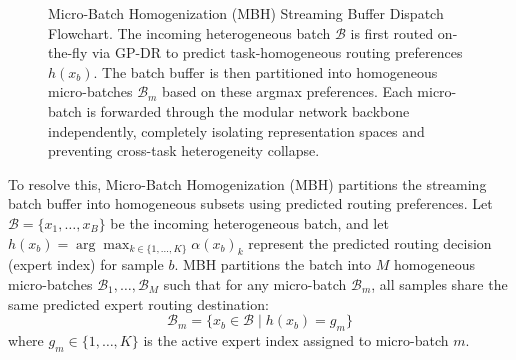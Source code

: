 \begin{figure}[t]
\centering
{}
\caption{Micro-Batch Homogenization (MBH) Streaming Buffer Dispatch Flowchart. The incoming heterogeneous batch $\mathcal{B}$ is first routed on-the-fly via GP-DR to predict task-homogeneous routing preferences $h(x_b)$. The batch buffer is then partitioned into homogeneous micro-batches $\mathcal{B}_m$ based on these argmax preferences. Each micro-batch is forwarded through the modular network backbone independently, completely isolating representation spaces and preventing cross-task heterogeneity collapse.}
\label{fig:mbh_flowchart}
\end{figure}

To resolve this, Micro-Batch Homogenization (MBH) partitions the streaming batch buffer into homogeneous subsets using predicted routing preferences. Let $\mathcal{B} = \{x_1, \dots, x_B\}$ be the incoming heterogeneous batch, and let $h(x_b) = \arg\max_{k \in \{1,\dots,K\}} \alpha(x_b)_k$ represent the predicted routing decision (expert index) for sample $b$. MBH partitions the batch into $M$ homogeneous micro-batches $\mathcal{B}_1, \dots, \mathcal{B}_M$ such that for any micro-batch $\mathcal{B}_m$, all samples share the same predicted expert routing destination:
\begin{equation}
\mathcal{B}_m = \{ x_b \in \mathcal{B} \mid h(x_b) = g_m \}
\end{equation}
where $g_m \in \{1, \dots, K\}$ is the active expert index assigned to micro-batch $m$. 

